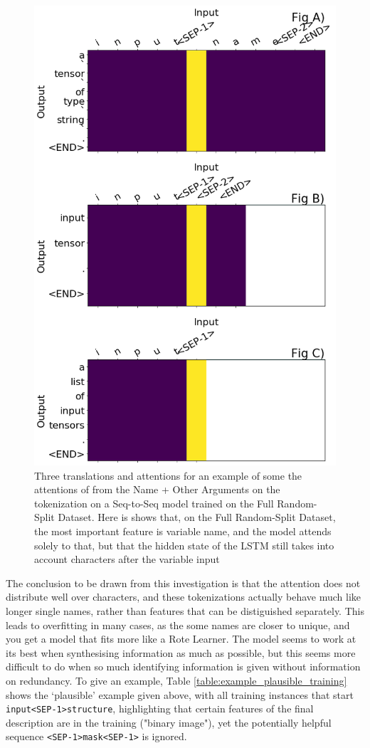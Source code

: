 \begin{figure}

\begin{center}
    \includegraphics[width=0.7\linewidth]{images/different_translations_dupsXotherargs_3230minib_white.png}
    \caption{Three translations and attentions for an example of some the attentions of from the Name + Other Arguments on the tokenization on a Seq-to-Seq model trained on the Full Random-Split Dataset. Here is shows that, on the Full Random-Split Dataset, the most important feature is variable name, and the model attends solely to that, but that the hidden state of the LSTM still takes into account characters after the variable input }
    \label{fig:otherarg_attn_full_dataset}
\end{center}
\end{figure}

The conclusion to be drawn from this investigation is that the attention does not distribute well over characters, and these tokenizations actually behave much like longer single names, rather than features that can be distiguished separately. 
This leads to overfitting in many cases, as the some names are closer to unique, and you get a model that fits more like a Rote Learner. 
The model seems to work at its best when synthesising information as much as possible, but this seems more difficult to do when so much identifying information is given without information on redundancy. 
To give an example, Table \ref{table:example_plausible_training} shows the `plausible' example given above, with all training instances that start \texttt{input<SEP-1>structure}, highlighting that certain features of the final description are in the training ("binary image"), yet the potentially helpful sequence \texttt{<SEP-1>mask<SEP-1>} is ignored.

